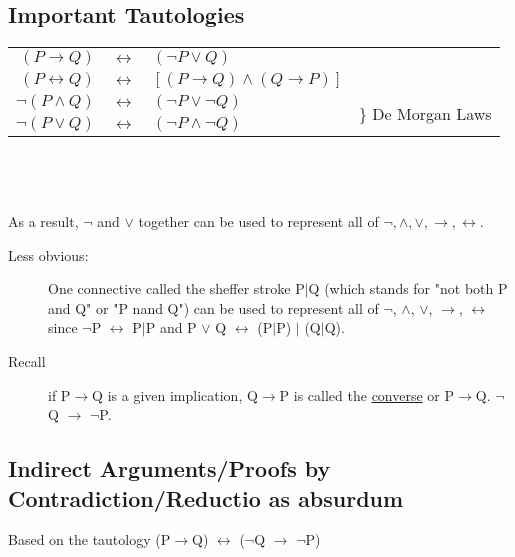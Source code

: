 \documentclass[10pt]{article}
\begin{document}
	\subsection{Important Tautologies}
	\begin{tabular}{rcll}
		$(P \rightarrow Q)$ & $\leftrightarrow$ & $(\lnot P \lor Q)$ \\
		$(P \leftrightarrow Q)$ & $\leftrightarrow$ & $[(P \rightarrow Q) \land (Q \rightarrow P)]$ \\
		$\lnot(P \land Q)$ & $\leftrightarrow$ & $(\lnot P \lor \lnot Q)$ & \multirow{2}{4cm}{\LARGE\} \normalsize De Morgan Laws} \\
		$\lnot(P \lor Q)$ & $\leftrightarrow$ & $(\lnot P \land \lnot Q)$ \\
	\end{tabular}
	~\\~\\~\\
	As a result, $\lnot$ and $\lor$ together can be used to represent all of $\lnot, \land, \lor, \rightarrow, \leftrightarrow$.
	
	\begin{description}
		\item[Less obvious:] One connective called the sheffer stroke P$\mid$Q (which stands for "not both P and Q" or "P nand Q") can be used to represent all of $\lnot$, $\land$, $\lor$, $\rightarrow$, $\leftrightarrow$ since $\lnot$P $\leftrightarrow$ P$\mid$P and P $\lor$ Q $\leftrightarrow$ (P$\mid$P) $\mid$ (Q$\mid$Q).
		\item[Recall] if P$\rightarrow$Q is a given implication, Q$\rightarrow$P is called the \underline{converse} or P$\rightarrow$Q. $\lnot$Q $\rightarrow$ $\lnot$P.
	\end{description}
	
	\subsection{Indirect Arguments/Proofs by Contradiction/Reductio as absurdum}
	Based on the tautology (P$\rightarrow$Q) $\leftrightarrow$ ($\lnot$Q $\rightarrow$ $\lnot$P)
	
\end{document}
